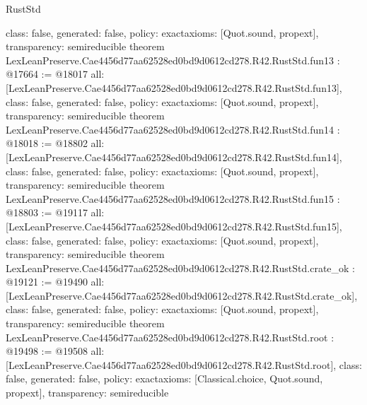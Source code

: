 \begin{lexlean}{RustStd}
\begin{coremodule}
{  class: false,
  generated: false,
  policy: exact{axioms: [Quot.sound, propext]},
  transparency: semireducible
}
theorem LexLeanPreserve.Cae4456d77aa62528ed0bd9d0612cd278.R42.RustStd.fun13 : @17664 := @18017 {
  all: [LexLeanPreserve.Cae4456d77aa62528ed0bd9d0612cd278.R42.RustStd.fun13],
  class: false,
  generated: false,
  policy: exact{axioms: [Quot.sound, propext]},
  transparency: semireducible
}
theorem LexLeanPreserve.Cae4456d77aa62528ed0bd9d0612cd278.R42.RustStd.fun14 : @18018 := @18802 {
  all: [LexLeanPreserve.Cae4456d77aa62528ed0bd9d0612cd278.R42.RustStd.fun14],
  class: false,
  generated: false,
  policy: exact{axioms: [Quot.sound, propext]},
  transparency: semireducible
}
theorem LexLeanPreserve.Cae4456d77aa62528ed0bd9d0612cd278.R42.RustStd.fun15 : @18803 := @19117 {
  all: [LexLeanPreserve.Cae4456d77aa62528ed0bd9d0612cd278.R42.RustStd.fun15],
  class: false,
  generated: false,
  policy: exact{axioms: [Quot.sound, propext]},
  transparency: semireducible
}
theorem LexLeanPreserve.Cae4456d77aa62528ed0bd9d0612cd278.R42.RustStd.crate_ok : @19121 := @19490 {
  all: [LexLeanPreserve.Cae4456d77aa62528ed0bd9d0612cd278.R42.RustStd.crate_ok],
  class: false,
  generated: false,
  policy: exact{axioms: [Quot.sound, propext]},
  transparency: semireducible
}
theorem LexLeanPreserve.Cae4456d77aa62528ed0bd9d0612cd278.R42.RustStd.root : @19498 := @19508 {
  all: [LexLeanPreserve.Cae4456d77aa62528ed0bd9d0612cd278.R42.RustStd.root],
  class: false,
  generated: false,
  policy: exact{axioms: [Classical.choice, Quot.sound, propext]},
  transparency: semireducible
}


\end{coremodule}
\end{lexlean}
